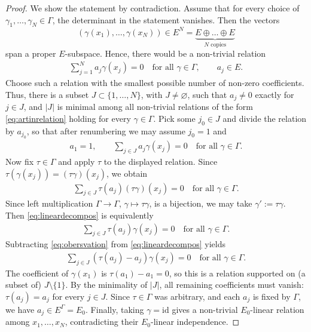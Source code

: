 \documentclass[11pt]{amsart}
\theoremstyle{definition}
\theoremstyle{plain}
\theoremstyle{conclusion}
\begin{document}
\begin{proof}
We show the statement by contradiction. Assume that for every choice of $\gamma_1,\ldots,\gamma_N \in \Gamma$, the determinant in the statement vanishes. Then the vectors $$(\gamma(x_1),\ldots,\gamma(x_N))\in E^N = \underbrace{E \oplus \ldots \oplus E}_{N\text{ copies}}$$ span a proper $E$-subspace. Hence, there would be a non-trivial relation \begin{align} 
\sum_{j=1}^N a_j\gamma(x_j)=0\quad\text{for all }\gamma\in\Gamma,\qquad a_j\in E .  \label{eq:artinrelation}
\end{align} Choose such a relation with the smallest possible number of non-zero coefficients. Thus, there is a subset $J\subset\{1,\ldots,N\}$, with $J\neq\varnothing$, such that $a_j\neq 0$ exactly for $j\in J$, and $|J|$ is minimal among all non-trivial relations of the form \eqref{eq:artinrelation} holding for every $\gamma\in\Gamma$. Pick some $j_0\in J$ and divide the relation by $a_{j_0}$, so that after renumbering we may assume $j_0=1$ and \begin{align*}
 a_1=1,\qquad \sum_{j\in J} a_j\gamma(x_j)=0\quad\text{for all }\gamma\in\Gamma.
\end{align*} Now fix $\tau\in\Gamma$ and apply $\tau$ to the displayed relation. Since $\tau(\gamma(x_j))=(\tau\gamma)(x_j)$, we obtain \begin{align}
 \sum_{j\in J} \tau(a_j)(\tau\gamma)(x_j)=0\quad\text{for all }\gamma\in\Gamma. \label{eq:lineardecompos}
\end{align} Since left multiplication $\Gamma \to \Gamma$, $\gamma \mapsto \tau\gamma$, is a bijection, we may take $\gamma':= \tau \gamma$. Then \eqref{eq:lineardecompos} is equivalently \begin{align}
 \sum_{j\in J} \tau(a_j)\gamma(x_j)=0\quad\text{for all }\gamma \in \Gamma. \label{eq:obersvation}
\end{align} Subtracting \eqref{eq:obersvation} from \eqref{eq:lineardecompos} yields \begin{align*}
 \sum_{j\in J} (\tau(a_j)-a_j)\gamma(x_j)=0\quad\text{for all }\gamma\in\Gamma.
\end{align*} The coefficient of $\gamma(x_1)$ is $\tau(a_1)-a_1=0$, so this is a relation supported on (a subset of) $J\setminus\{1\}$. By the minimality of $|J|$, all remaining coefficients must vanish: $\tau(a_j)=a_j$ for every $j\in J$. Since $\tau\in\Gamma$ was arbitrary, and each $a_j$ is fixed by $\Gamma$, we have $a_j \in E^\Gamma=E_0$. Finally, taking $\gamma=\mathrm{id}$ gives a non-trivial $E_0$-linear relation among $x_1,\ldots,x_N$, contradicting their $E_0$-linear independence.
\end{proof}
\end{document}
